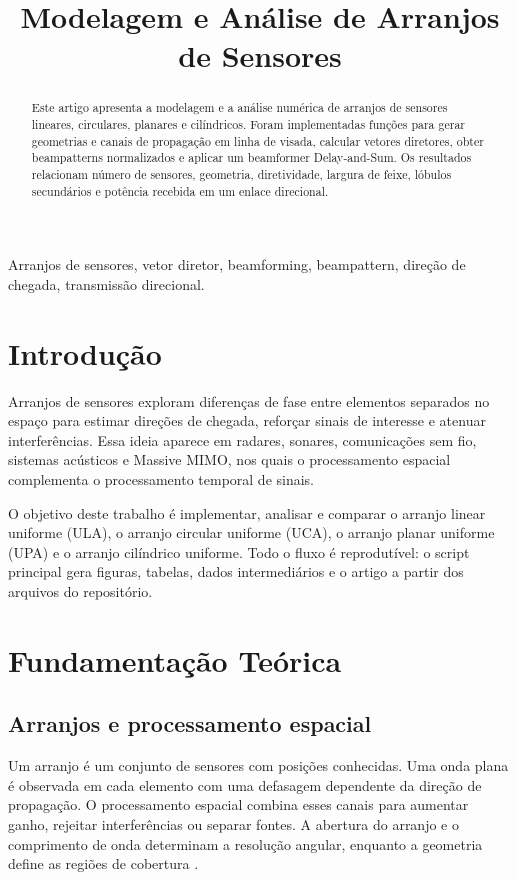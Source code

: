 \documentclass[conference]{IEEEtran}
\title{Modelagem e Análise de Arranjos de Sensores}
\author{
\IEEEauthorblockN{\small Gabriel Florencio da Fonseca, Pedro Nicollas Pereira Azevedo
Della Torre Bastos, Ricardo Alexandre Vieira da Silva}
\IEEEauthorblockA{\small Processamento de Sinais I\\CEFET/RJ}
}
\begin{document}
\maketitle

\begin{abstract}
Este artigo apresenta a modelagem e a análise numérica de arranjos de sensores
lineares, circulares, planares e cilíndricos. Foram implementadas funções para
gerar geometrias e canais de propagação em linha de visada, calcular vetores
diretores, obter beampatterns normalizados e aplicar um beamformer
Delay-and-Sum. Os resultados relacionam número de sensores, geometria,
diretividade, largura de feixe, lóbulos secundários e potência recebida em um
enlace direcional.
\end{abstract}

\begin{IEEEkeywords}
Arranjos de sensores, vetor diretor, beamforming, beampattern, direção de
chegada, transmissão direcional.
\end{IEEEkeywords}

\section{Introdução}
Arranjos de sensores exploram diferenças de fase entre elementos separados no
espaço para estimar direções de chegada, reforçar sinais de interesse e atenuar
interferências. Essa ideia aparece em radares, sonares, comunicações sem fio,
sistemas acústicos e Massive MIMO, nos quais o processamento espacial
complementa o processamento temporal de sinais.

O objetivo deste trabalho é implementar, analisar e comparar o arranjo linear
uniforme (ULA), o arranjo circular uniforme (UCA), o arranjo planar uniforme
(UPA) e o arranjo cilíndrico uniforme. Todo o fluxo é reprodutível: o script
principal gera figuras, tabelas, dados intermediários e o artigo a partir dos
arquivos do repositório.

\section{Fundamentação Teórica}
\subsection{Arranjos e processamento espacial}
Um arranjo é um conjunto de sensores com posições conhecidas. Uma onda plana é
observada em cada elemento com uma defasagem dependente da direção de
propagação. O processamento espacial combina esses canais para aumentar ganho,
rejeitar interferências ou separar fontes. A abertura do arranjo e o
comprimento de onda determinam a resolução angular, enquanto a geometria define
as regiões de cobertura \cite{vantrees,balanis}.
\end{document}
